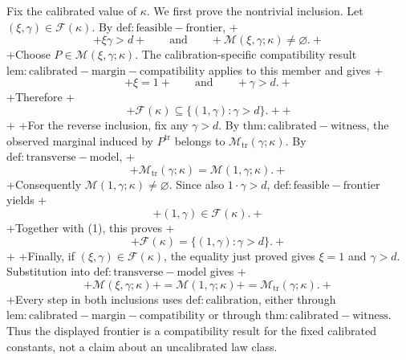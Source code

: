Fix the calibrated value of \(\kappa\). We first prove the nontrivial inclusion. Let \((\xi,\gamma)\in\mathcal F(\kappa)\). By \(\mathrm{def:feasible-frontier}\),
+\[
+\xi\gamma>d
+\qquad\text{and}\qquad
+\mathcal M(\xi,\gamma;\kappa)\ne\varnothing.
+\]
+Choose \(P\in\mathcal M(\xi,\gamma;\kappa)\). The calibration-specific compatibility result \(\mathrm{lem:calibrated-margin-compatibility}\) applies to this member and gives
+\[
+\xi=1
+\qquad\text{and}\qquad
+\gamma>d.
+\]
+Therefore
+\[
+\mathcal F(\kappa)\subseteq\{(1,\gamma):\gamma>d\}.
+\tag{1}
+\]
+
+For the reverse inclusion, fix any \(\gamma>d\). By \(\mathrm{thm:calibrated-witness}\), the observed marginal induced by \(P^{\mathrm{tr}}\) belongs to \(\mathcal M_{\mathrm{tr}}(\gamma;\kappa)\). By \(\mathrm{def:transverse-model}\),
+\[
+\mathcal M_{\mathrm{tr}}(\gamma;\kappa)=\mathcal M(1,\gamma;\kappa).
+\]
+Consequently \(\mathcal M(1,\gamma;\kappa)\ne\varnothing\). Since also \(1\cdot\gamma>d\), \(\mathrm{def:feasible-frontier}\) yields
+\[
+(1,\gamma)\in\mathcal F(\kappa).
+\]
+Together with (1), this proves
+\[
+\mathcal F(\kappa)=\{(1,\gamma):\gamma>d\}.
+\]
+
+Finally, if \((\xi,\gamma)\in\mathcal F(\kappa)\), the equality just proved gives \(\xi=1\) and \(\gamma>d\). Substitution into \(\mathrm{def:transverse-model}\) gives
+\[
+\mathcal M(\xi,\gamma;\kappa)
+=\mathcal M(1,\gamma;\kappa)
+=\mathcal M_{\mathrm{tr}}(\gamma;\kappa).
+\]
+Every step in both inclusions uses \(\mathrm{def:calibration}\), either through \(\mathrm{lem:calibrated-margin-compatibility}\) or through \(\mathrm{thm:calibrated-witness}\). Thus the displayed frontier is a compatibility result for the fixed calibrated constants, not a claim about an uncalibrated law class.
